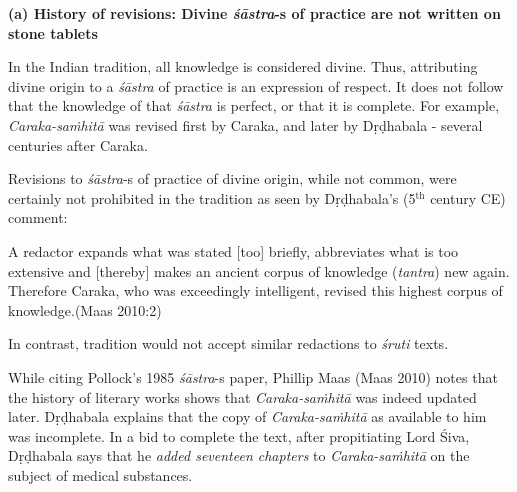{\bf (a) History of revisions: Divine {\sl\bfseries śāstra}-s of practice are not written on stone tablets}

In the Indian tradition, all knowledge is considered divine.  Thus, attributing divine origin to a {\sl śāstra} of practice is an expression of respect.  It does not follow that the knowledge of that {\sl śāstra} is perfect, or that it is complete.  For example, {\sl Caraka-saṁhitā} was revised first by Caraka, and later by Dṛḍhabala - several centuries after Caraka.

Revisions to {\sl śāstra}-s of practice of divine origin, while not common, were certainly not prohibited in the tradition as seen by Dṛḍhabala's (5$^{\text{th}}$ century CE) comment:
\begin{myquote}
A redactor expands what was stated [too] briefly, abbreviates what is too extensive and [thereby] makes an ancient corpus of knowledge ({\sl tantra}) new again. Therefore Caraka, who was exceedingly intelligent, revised this highest corpus of knowledge.\hfill (Maas 2010:2)
\end{myquote}

In contrast, tradition would not accept similar redactions to {\sl śruti} texts.

While citing Pollock's 1985 {\sl śāstra}-s paper, Phillip Maas (Maas 2010) notes that the history of literary works shows that {\sl Caraka-saṁhitā} was indeed updated later.  Dṛḍhabala explains that the copy of {\sl Caraka-saṁhitā} as available to him was incomplete.  In a bid to complete the text, after propitiating Lord Śiva, Dṛḍhabala says that he {\sl added seventeen chapters} to {\sl Caraka-saṁhitā} on the subject of medical substances.

